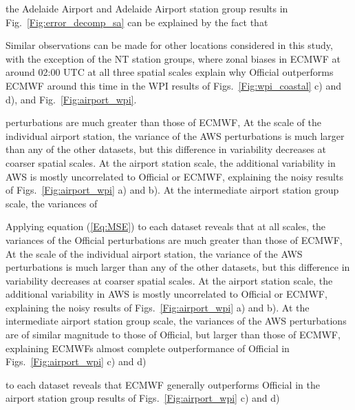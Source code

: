 \documentclass{article}
\begin{document}
\begin{comment}
Note that the Bureau has not yet moved to ensemble forecasting - and probabilistic verification methods are therefore not appropriate. 
\end{comment}


the Adelaide Airport and Adelaide Airport station group results in Fig.~\ref{Fig:error_decomp_sa} can be explained by the fact that 

  Similar observations can be made for other locations considered in this study, with the exception of the NT station groups, where zonal biases in ECMWF at around 02:00 UTC at all three spatial scales explain why Official outperforms ECMWF around this time in the WPI results of Figs.~\ref{Fig:wpi_coastal} c) and d), and Fig.~\ref{Fig:airport_wpi}.           

perturbations are much greater than those of ECMWF, At the scale of the individual airport station, the variance of the AWS perturbations is much larger than any of the other datasets, but this difference in variability decreases at coarser spatial scales. At the airport station scale, the additional variability in AWS is mostly uncorrelated to Official or ECMWF, explaining the noisy results of Figs.~\ref{Fig:airport_wpi} a) and b). At the intermediate airport station group scale, the variances of



Applying equation (\ref{Eq:MSE}) to each dataset reveals that at all scales, the variances of the Official perturbations are much greater than those of ECMWF, At the scale of the individual airport station, the variance of the AWS perturbations is much larger than any of the other datasets, but this difference in variability decreases at coarser spatial scales. At the airport station scale, the additional variability in AWS is mostly uncorrelated to Official or ECMWF, explaining the noisy results of Figs.~\ref{Fig:airport_wpi} a) and b). At the intermediate airport station group scale, the variances of the AWS perturbations are of similar magnitude to those of Official, but larger than those of ECMWF, explaining ECMWFs almost complete outperformance of Official in Figs.~\ref{Fig:airport_wpi} c) and d)             

to each dataset reveals that ECMWF generally outperforms Official in the airport station group results of Figs.~\ref{Fig:airport_wpi} c) and d) 
\end{document}
